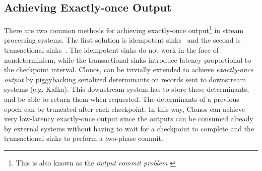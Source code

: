 \documentclass[sigconf]{acmart}
\newcommand{\para}[1]{\vspace{1mm}\noindent\textbf{#1.}}
\begin{document}
\subsection{Achieving Exactly-once Output}
\label{sec:exactly-once-output}
There are two common methods for achieving exactly-once output\footnote{This is also known as the \textit{output commit problem} \cite{elnozahy2002survey}} in stream processing systems. The first solution is idempotent sinks~\cite{ArmbrustDT18,CUSTOM:web/Storm,CUSTOM:web/Trident} and the second is transactional sinks~\cite{ArmbrustDT18, CarboneEF17}.
The idempotent sinks do not work in the face of nondeterminism, while the transactional sinks introduce latency proportional to the checkpoint interval.
Clonos, can be trivially extended to achieve \textit{exactly-once output} by piggybacking serialized determinants on records sent to downstream systems (e.g. Kafka).
This downstream system has to store these determinants, and be able to return them when requested. The determinants of a previous epoch can be truncated after each checkpoint. 
In this way, Clonos can achieve very low-latency exactly-once output since the outputs can be consumed already by external systems without having to wait for a checkpoint to complete and the transactional sinks to perform a two-phase commit.











\end{document}
